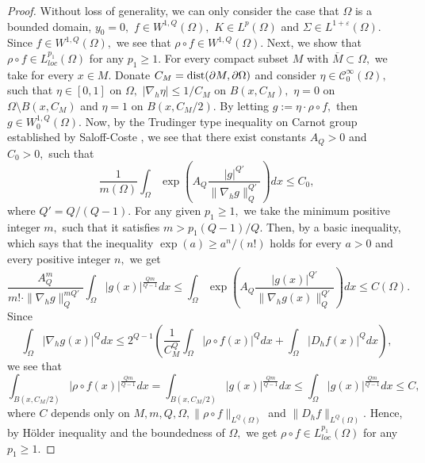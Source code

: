 \documentclass[11pt,twoside]{article}
\theoremstyle{definition}
\theoremstyle{remark}
\begin{document}
\begin{proof}
Without loss of generality, we can only consider the case that $\Omega$ is a bounded domain, $y_{0}=0,$  $f\in W^{1,Q}(\Omega),$ $K\in L^{p}(\Omega)$ and $\Sigma\in L^{1+\varepsilon}(\Omega).$  Since $f\in W^{1,Q}(\Omega),$
we see that $\rho\circ f\in W^{1,Q}(\Omega).$ Next, we show that $\rho\circ f\in L_{loc}^{p_{1}}(\Omega)$ for any $p_{1}\geq1.$ For every compact subset $M$ with  $\overline{M}\subset\Omega,$ we take for every 
$x\in M.$  Donate $C_{M}={\rm dist}(\partial M,\partial\Omega)$ and consider  $\eta\in \mathcal{C}_{0}^{\infty}(\Omega),$ such that $\eta\in[0,1]$ on $\Omega,$  $\vert\nabla_{h} \eta\vert\leq 1/C_{M}$ on $B(x,C_{M}),$ $\eta=0$ on $\Omega\setminus B(x, C_{M})$ and $\eta=1$ on $B(x,C_{M}/2).$ By letting $g:=\eta\cdot\rho\circ f,$ then $g\in W_{0}^{1,Q}(\Omega).$ Now, by the Trudinger type inequality on Carnot group established by Saloff-Coste \cite{SC88}, we see that there exist constants  $A_{Q}>0 $ and $C_{0}>0,$ such that
$$\frac{1}{m(\Omega)}\int_{\Omega}\exp\left(A_{Q}\frac{\vert g\vert^{Q'}}{\|\nabla_{h}g\|_{Q}^{Q'}}\right)dx\leq C_{0},$$
where $Q'=Q/(Q-1).$  For any given $p_{1}\geq1,$ we take the minimum positive integer $m,$ such that it satisfies $m> p_{1}(Q-1)/Q.$ Then, by a basic inequality, which says that the inequality $\exp(a)\geq a^{n}/(n!)$ holds for every $a>0$ and every positive integer $n,$ we get
$$\frac{A_{Q}^{m}}{m!\cdot\|\nabla_{h}g\|_{Q}^{mQ'}}\int_{\Omega}\vert g(x)\vert^{\frac{Qm}{Q-1}}dx\leq\int_{\Omega}\exp\left(A_{Q}\frac{\vert g(x)\vert^{Q'}}{\|\nabla_{h}g(x)\|_{Q}^{Q'}}\right)dx\leq C(\Omega).$$
Since
$$\int_{\Omega}\vert\nabla_{h} g(x)\vert^{Q}dx\leq2^{Q-1}\left(\frac{1}{C_{M}^{Q}}\int_{\Omega}\vert\rho\circ f(x)\vert^{Q}dx+\int_{\Omega}\vert D_{h}f(x)\vert^{Q}dx\right),$$
we see that
$$\int_{B(x,C_{M}/2)}\vert \rho\circ f(x)\vert^{\frac{Qm}{Q-1}}dx=\int_{B(x,C_{M}/2)}\vert g(x)\vert^{\frac{Qm}{Q-1}}dx\leq\int_{\Omega}\vert g(x)\vert^{\frac{Qm}{Q-1}}dx\leq C,$$
where $C$ depends only on $M, m,Q,\Omega,\|\rho\circ f\|_{L^{Q}(\Omega)}$ and $\|D_{h} f\|_{L^{Q}(\Omega)}.$
Hence, by H\"{o}lder inequality and the boundedness of $\Omega,$ we get $\rho\circ f\in L_{loc}^{p_{1}}(\Omega)$ for any $p_{1}\geq1.$ 


\end{proof}
\end{document}
